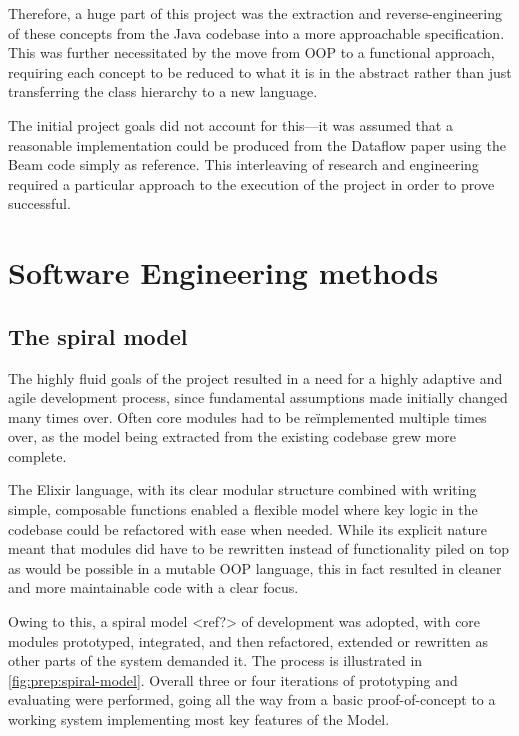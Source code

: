 Therefore, a huge part of this project was the extraction and reverse-engineering of these concepts from the Java codebase into a more approachable specification.
This was further necessitated by the move from OOP to a functional approach, requiring each concept to be reduced to what it is in the abstract rather than just transferring the class hierarchy to a new language.

The initial project goals did not account for this---it was assumed that a reasonable implementation could be produced from the Dataflow paper \cite{Akidau:2015} using the Beam code simply as reference.
This interleaving of research and engineering required a particular approach to the execution of the project in order to prove successful.


\section{Software Engineering methods}\label{sec:prep:softeng}

\subsection{The spiral model}

The highly fluid goals of the project resulted in a need for a highly adaptive and agile development process, since fundamental assumptions made initially changed many times over.
Often core modules had to be re\"implemented multiple times over, as the model being extracted from the existing codebase grew more complete.

The Elixir language, with its clear modular structure combined with writing simple, composable functions enabled a flexible model where key logic in the codebase could be refactored with ease when needed.
While its explicit nature meant that modules did have to be rewritten instead of functionality piled on top as would be possible in a mutable OOP language, this in fact resulted in cleaner and more maintainable code with a clear focus.

Owing to this, a spiral model <ref?> of development was adopted, with core modules prototyped, integrated, and then refactored, extended or rewritten as other parts of the system demanded it.
The process is illustrated in \cref{fig:prep:spiral-model}.
Overall three or four iterations of prototyping and evaluating were performed, going all the way from a basic proof-of-concept to a working system implementing most key features of the Model.

